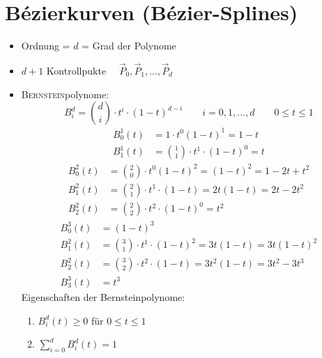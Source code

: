 \section{Bézierkurven (Bézier-Splines)}
\begin{itemize}
 \item Ordnung = $d$ = Grad der Polynome
 \item $d + 1$ Kontrollpukte $\quad \vec P_0, \vec P_1, ..., \vec P_d$
 \item \textsc{Bernstein}polynome:
	\[\boxed{B^d_i = \binom{d}{i} \cdot t^i \cdot (1-t)^{d-i}}\qquad i = 0,1,...,d \qquad 0 \le t \le 1\]
		\begin{align*}
		 B_0^1(t) &= 1 \cdot t^0 (1-t)^1 = 1-t\\
		 B_1^1(t) &= \binom{1}{1} \cdot t^1 \cdot (1-t)^0 = t
		\end{align*}
		\begin{align*}
		 B_0^2(t) &= \binom{2}{0} \cdot t^0 (1-t)^2 = (1-t)^2 = 1-2t+t^2\\
		 B_1^2(t) &= \binom{2}{1} \cdot t^1 \cdot (1-t) = 2t(1-t) = 2t-2t^2\\
		 B_2^2(t) &= \binom{2}{2} \cdot t^2 \cdot (1-t)^0 = t^2
		\end{align*}
		\begin{align*}
		 B_0^3(t) &= (1-t)^3\\
		 B_1^2(t) &= \binom{3}{1} \cdot t^1 \cdot (1-t)^2 = 3t(1-t) = 3t(1-t)^2\\
		 B_2^2(t) &= \binom{3}{2} \cdot t^2 \cdot (1-t) = 3t^2(1-t) = 3t^2 - 3t^3\\
		 B_3^3(t) &= t^3
		\end{align*}
	Eigenschaften der Bernsteinpolynome:
	\begin{enumerate}
	 \item $B_i^d(t) \ge 0$ für $0 \le t \le 1$
	 \item $\boxed{\sum\limits_{i=0}^{d} B_i^d(t) = 1}$

\end{enumerate}
\end{itemize}
